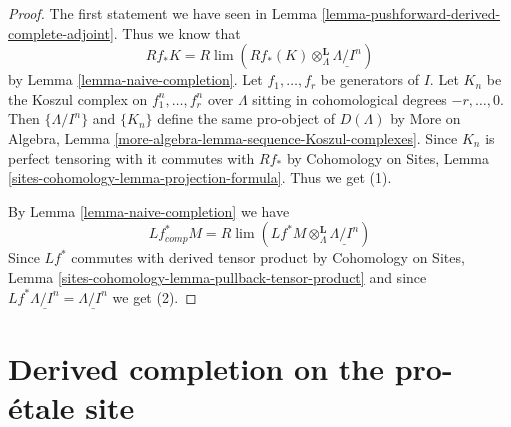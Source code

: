 \begin{proof}
The first statement we have seen in
Lemma \ref{lemma-pushforward-derived-complete-adjoint}.
Thus we know that
$$
Rf_*K = R\lim ( Rf_*(K) \otimes^\mathbf{L}_\Lambda \underline{\Lambda/I^n})
$$
by Lemma \ref{lemma-naive-completion}.
Let $f_1, \ldots, f_r$ be generators of $I$. Let $K_n$ be the
Koszul complex on $f_1^n, \ldots, f_r^n$ over $\Lambda$ sitting
in cohomological degrees $-r, \ldots, 0$. Then
$\{\Lambda/I^n\}$ and $\{K_n\}$ define the same pro-object of
$D(\Lambda)$ by
More on Algebra, Lemma \ref{more-algebra-lemma-sequence-Koszul-complexes}.
Since $K_n$ is perfect tensoring with it commutes with $Rf_*$ by
Cohomology on Sites, Lemma \ref{sites-cohomology-lemma-projection-formula}.
Thus we get (1).

\medskip\noindent
By Lemma \ref{lemma-naive-completion} we have
$$
Lf_{comp}^*M =
R\lim ( Lf^*M \otimes_\Lambda^\mathbf{L} \underline{\Lambda/I^n})
$$
Since $Lf^*$ commutes with derived tensor product by
Cohomology on Sites, Lemma \ref{sites-cohomology-lemma-pullback-tensor-product}
and since $Lf^*\underline{\Lambda/I^n} = \underline{\Lambda/I^n}$
we get (2).
\end{proof}







\section{Derived completion on the pro-\'etale site}
\label{section-derived-completion-proetale}

